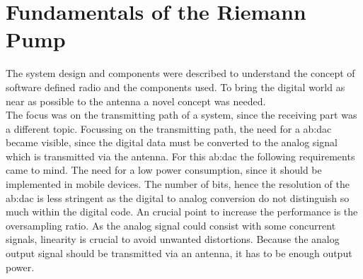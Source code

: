 \chapter{Fundamentals of the Riemann Pump}
\label{ch:fundamentals}
The system design and components were described to understand the concept of software defined radio and the components used.
To bring the digital world as near as possible to the antenna a novel concept was needed.\\
The focus was on the transmitting path of a system, since the receiving part was a different topic.
Focussing on the transmitting path, the need for a \gls{ab:dac} became visible, since the digital data must be converted to the analog signal which is transmitted via the antenna.
For this \gls{ab:dac} the following requirements came to mind.
The need for a low power consumption, since it should be implemented in mobile devices.
The number of bits, hence the resolution of the \gls{ab:dac} is less stringent as the digital to analog conversion do not distinguish so much within the digital code.
An crucial point to increase the performance is the oversampling ratio. 
As the analog signal could consist with some concurrent signals, linearity is crucial to avoid unwanted distortions.
Because the analog output signal should be transmitted via an antenna, it has to be enough output power.



